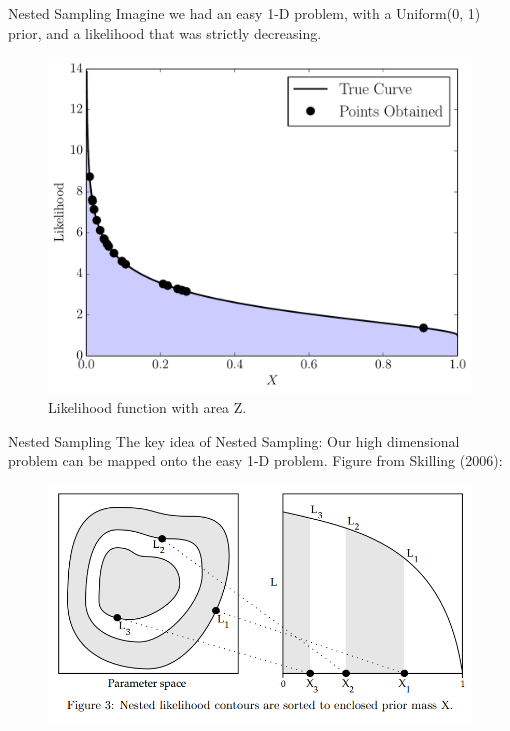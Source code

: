 \documentclass{beamer}
\begin{document}
\begin{frame}[t]{Nested Sampling}
Imagine we had an easy 1-D problem, with a Uniform(0, 1) prior, and a likelihood
that was strictly decreasing.

\begin{center}
\begin{figure}
\includegraphics[scale=0.35]{figures/nested1.pdf}
\caption{Likelihood function with area Z.}
\end{figure}
\end{center}

\end{frame}


\begin{frame}[t]{Nested Sampling}
The key idea of Nested Sampling: Our high dimensional problem can be mapped
onto the easy 1-D problem. Figure from Skilling (2006):

\begin{figure}
\begin{center}
\includegraphics[scale=0.3]{figures/ns.png}
\end{center}
\end{figure}

\end{frame}
\end{document}

